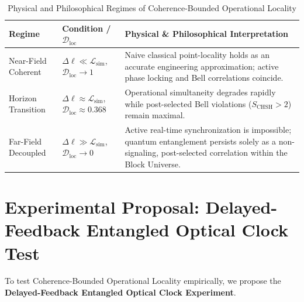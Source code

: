 \documentclass[11pt,a4paper]{article}
\begin{document}
\begin{table}[h!]
\centering
\caption{Physical and Philosophical Regimes of Coherence-Bounded Operational Locality}
\label{tab:regimes}
\begin{tabular}{@{}llp{7.8cm}@{}}
\toprule
\textbf{Regime} & \textbf{Condition / $\mathcal{D}_{\mathrm{loc}}$} & \textbf{Physical \& Philosophical Interpretation} \\
\midrule
Near-Field Coherent & $\Delta\ell \ll \mathcal{L}_{\mathrm{sim}}$, $\mathcal{D}_{\mathrm{loc}} \to 1$ & Naive classical point-locality holds as an accurate engineering approximation; active phase locking and Bell correlations coincide. \\
\addlinespace
Horizon Transition & $\Delta\ell \approx \mathcal{L}_{\mathrm{sim}}$, $\mathcal{D}_{\mathrm{loc}} \approx 0.368$ & Operational simultaneity degrades rapidly while post-selected Bell violations ($S_{\mathrm{CHSH}} > 2$) remain maximal. \\
\addlinespace
Far-Field Decoupled & $\Delta\ell \gg \mathcal{L}_{\mathrm{sim}}$, $\mathcal{D}_{\mathrm{loc}} \to 0$ & Active real-time synchronization is impossible; quantum entanglement persists solely as a non-signaling, post-selected correlation within the Block Universe. \\
\bottomrule
\end{tabular}
\end{table}

\section{Experimental Proposal: Delayed-Feedback Entangled Optical Clock Test}

To test Coherence-Bounded Operational Locality empirically, we propose the \textbf{Delayed-Feedback Entangled Optical Clock Experiment}.
\end{document}
